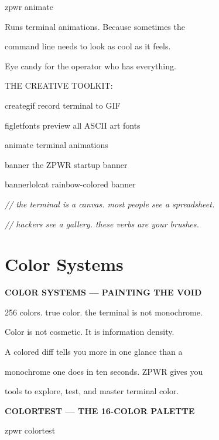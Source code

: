 \documentclass[11pt,a4paper,twoside]{book}
\begin{document}
\begin{codebox}
zpwr animate\\
\end{codebox}

Runs terminal animations. Because sometimes the

command line needs to look as cool as it feels.

Eye candy for the operator who has everything.

THE CREATIVE TOOLKIT:

creategif       record terminal to GIF

figletfonts     preview all ASCII art fonts

animate         terminal animations

banner          the ZPWR startup banner

bannerlolcat    rainbow-colored banner

{\small\itshape\color{dimtext} // the terminal is a canvas. most people see a spreadsheet.}

{\small\itshape\color{dimtext} // hackers see a gallery. these verbs are your brushes.}


\vspace{16pt}

\section{Color Systems}


\vspace{10pt}
{\large\bfseries\color{neoncyan} COLOR SYSTEMS — PAINTING THE VOID}\vspace{6pt}

256 colors. true color. the terminal is not monochrome.

Color is not cosmetic. It is information density.

A colored diff tells you more in one glance than a

monochrome one does in ten seconds. ZPWR gives you

tools to explore, test, and master terminal color.


\vspace{12pt}
{\bfseries\color{neonyellow} COLORTEST — THE 16-COLOR PALETTE}\vspace{4pt}

\begin{codebox}
zpwr colortest\\
\end{codebox}
\end{document}
